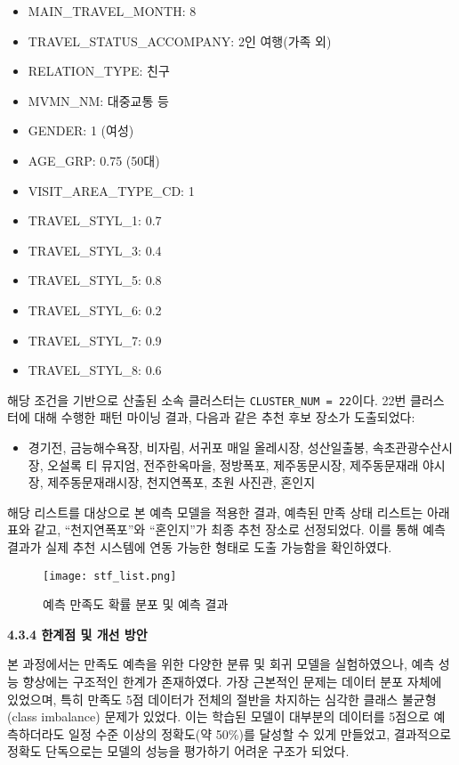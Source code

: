 \documentclass[sigconf]{acmart}
\begin{document}
\begin{CJK}{UTF8}{mj}
\begin{itemize}
  \item MAIN\_TRAVEL\_MONTH: 8
  \item TRAVEL\_STATUS\_ACCOMPANY: 2인 여행(가족 외)
  \item RELATION\_TYPE: 친구
  \item MVMN\_NM: 대중교통 등
  \item GENDER: 1 (여성)
  \item AGE\_GRP: 0.75 (50대)
  \item VISIT\_AREA\_TYPE\_CD: 1
  \item TRAVEL\_STYL\_1: 0.7
  \item TRAVEL\_STYL\_3: 0.4
  \item TRAVEL\_STYL\_5: 0.8
  \item TRAVEL\_STYL\_6: 0.2
  \item TRAVEL\_STYL\_7: 0.9
  \item TRAVEL\_STYL\_8: 0.6
\end{itemize}

해당 조건을 기반으로 산출된 소속 클러스터는 \texttt{CLUSTER\_NUM = 22}이다.  
22번 클러스터에 대해 수행한 패턴 마이닝 결과, 다음과 같은 추천 후보 장소가 도출되었다:

\begin{itemize}
  \item 경기전, 금능해수욕장, 비자림, 서귀포 매일 올레시장, 성산일출봉, 속초관광수산시장, 오설록 티 뮤지엄, 전주한옥마을, 정방폭포, 제주동문시장, 제주동문재래 야시장, 제주동문재래시장, 천지연폭포, 초원 사진관, 혼인지
\end{itemize}

해당 리스트를 대상으로 본 예측 모델을 적용한 결과, 예측된 만족 상태 리스트는 아래 표와 같고, “천지연폭포”와 “혼인지”가 최종 추천 장소로 선정되었다.  
이를 통해 예측 결과가 실제 추천 시스템에 연동 가능한 형태로 도출 가능함을 확인하였다.
    \begin{figure}[H]
    \centering
    \texttt{[image: stf\_list.png]}
    \caption{예측 만족도 확률 분포 및 예측 결과}
    \label{fig:satisfaction_list}
    \end{figure}

\vspace{1em}
\noindent\textbf{4.3.4 한계점 및 개선 방안}\par

본 과정에서는 만족도 예측을 위한 다양한 분류 및 회귀 모델을 실험하였으나, 예측 성능 향상에는 구조적인 한계가 존재하였다.  
가장 근본적인 문제는 데이터 분포 자체에 있었으며, 특히 만족도 5점 데이터가 전체의 절반을 차지하는 심각한 클래스 불균형(class imbalance) 문제가 있었다.  
이는 학습된 모델이 대부분의 데이터를 5점으로 예측하더라도 일정 수준 이상의 정확도(약 50\%)를 달성할 수 있게 만들었고, 결과적으로 정확도 단독으로는 모델의 성능을 평가하기 어려운 구조가 되었다.


\end{CJK}
\end{document}
